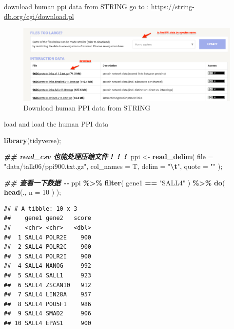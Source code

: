 \documentclass[ignorenonframetext,]{beamer}
\newenvironment{Shaded}{\begin{snugshade}}{\end{snugshade}}
\newcommand{\AttributeTok}[1]{\textcolor[rgb]{0.13,0.29,0.53}{#1}}
\newcommand{\DecValTok}[1]{\textcolor[rgb]{0.00,0.00,0.81}{#1}}
\newcommand{\DocumentationTok}[1]{\textcolor[rgb]{0.56,0.35,0.01}{\textbf{\textit{#1}}}}
\newcommand{\FunctionTok}[1]{\textcolor[rgb]{0.13,0.29,0.53}{\textbf{#1}}}
\newcommand{\NormalTok}[1]{#1}
\newcommand{\OtherTok}[1]{\textcolor[rgb]{0.56,0.35,0.01}{#1}}
\newcommand{\SpecialCharTok}[1]{\textcolor[rgb]{0.81,0.36,0.00}{\textbf{#1}}}
\newcommand{\StringTok}[1]{\textcolor[rgb]{0.31,0.60,0.02}{#1}}
\newcommand\FontSmall{\fontsize{7}{8}\selectfont}
\begin{document}
\begin{frame}{download human ppi data from STRING}
\protect\hypertarget{download-human-ppi-data-from-string}{}
go to : \url{https://string-db.org/cgi/download.pl}

\begin{figure}
\centering
\includegraphics[width=\textwidth,height=0.5\textheight]{images/talk06/download_human_PPI_from_string.png}
\caption{Download human PPI data from STRING}
\end{figure}
\end{frame}

\begin{frame}[fragile]{load and load the human PPI data}
\protect\hypertarget{load-and-load-the-human-ppi-data}{}
\FontSmall

\begin{Shaded}
\begin{Highlighting}[]
\FunctionTok{library}\NormalTok{(tidyverse);}
\end{Highlighting}
\end{Shaded}

\begin{Shaded}
\begin{Highlighting}[]
\DocumentationTok{\#\# read\_csv 也能处理压缩文件！！！ }
\NormalTok{ppi }\OtherTok{\textless{}{-}} \FunctionTok{read\_delim}\NormalTok{( }\AttributeTok{file =} \StringTok{"data/talk06/ppi900.txt.gz"}\NormalTok{, }\AttributeTok{col\_names =}\NormalTok{ T, }
                   \AttributeTok{delim =}  \StringTok{"}\SpecialCharTok{\textbackslash{}t}\StringTok{"}\NormalTok{, }\AttributeTok{quote =} \StringTok{""}\NormalTok{ );}

\DocumentationTok{\#\# 查看一下数据 {-}{-}}
\NormalTok{ppi }\SpecialCharTok{\%\textgreater{}\%} \FunctionTok{filter}\NormalTok{( gene1 }\SpecialCharTok{==} \StringTok{"SALL4"}\NormalTok{ ) }\SpecialCharTok{\%\textgreater{}\%} \FunctionTok{do}\NormalTok{( }\FunctionTok{head}\NormalTok{(.,  }\AttributeTok{n =} \DecValTok{10}\NormalTok{ ) );}
\end{Highlighting}
\end{Shaded}

\begin{verbatim}
## # A tibble: 10 x 3
##    gene1 gene2   score
##    <chr> <chr>   <dbl>
##  1 SALL4 POLR2E    900
##  2 SALL4 POLR2C    900
##  3 SALL4 POLR2I    900
##  4 SALL4 NANOG     992
##  5 SALL4 SALL1     923
##  6 SALL4 ZSCAN10   912
##  7 SALL4 LIN28A    957
##  8 SALL4 POU5F1    986
##  9 SALL4 SMAD2     906
## 10 SALL4 EPAS1     900
\end{verbatim}
\end{frame}
\end{document}
